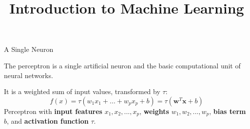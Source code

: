 \documentclass[11pt,compress,t,notes=noshow, xcolor=table]{beamer}
\title{Introduction to Machine Learning}
\begin{document}




\begin{framei} {A Single Neuron}
\vfill
\item The perceptron is a single artificial neuron and the basic computational unit of neural networks.
\vfill
\item It is a weighted sum of input values, transformed by $\tau$:
\vfill
$$f(x) = \tau(w_1x_1 + ... + w_px_p +  b) = \tau(\mathbf{w}^T \mathbf{x}+b)$$
\vfill
{}
{\footnotesize Perceptron %
with \textbf{input features} $x_1, x_2, ... ,x_p$, \textbf{weights} $w_1, w_2,... ,w_p$, \textbf{bias term} $b$, and \textbf{activation function} $\tau$.}
\end{framei}
\end{document}
